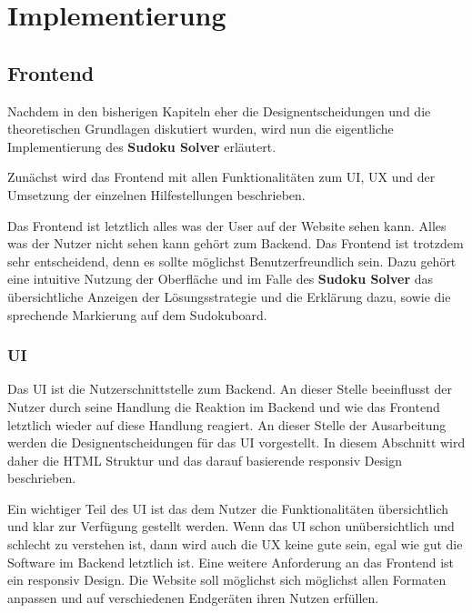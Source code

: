 
\part{Implementierung}

\chapter{Frontend}
Nachdem in den bisherigen Kapiteln eher die Designentscheidungen und die theoretischen Grundlagen diskutiert wurden, wird nun die eigentliche Implementierung des \textbf{Sudoku Solver} erläutert.

Zunächst wird das Frontend mit allen Funktionalitäten zum \acs{UI}, \acs{UX} und der Umsetzung der einzelnen Hilfestellungen beschrieben. 

Das Frontend ist letztlich alles was der User auf der Website sehen kann. Alles was der Nutzer nicht sehen kann gehört zum Backend. Das Frontend ist trotzdem sehr entscheidend, denn es sollte möglichst Benutzerfreundlich sein. Dazu gehört eine intuitive Nutzung der Oberfläche und im Falle des \textbf{Sudoku Solver} das übersichtliche Anzeigen der Lösungsstrategie und die Erklärung dazu, sowie die sprechende Markierung auf dem Sudokuboard.

\section{\acl{UI}}
Das \acs{UI} ist die Nutzerschnittstelle zum Backend. An dieser Stelle beeinflusst der Nutzer durch seine Handlung die Reaktion im Backend und wie das Frontend letztlich wieder auf diese Handlung reagiert. An dieser Stelle der Ausarbeitung werden die Designentscheidungen für das \ac{UI} vorgestellt. In diesem Abschnitt wird daher die \ac{HTML} Struktur und das darauf basierende responsiv Design beschrieben.

Ein wichtiger Teil des \ac{UI} ist das dem Nutzer die Funktionalitäten übersichtlich und klar zur Verfügung gestellt werden. Wenn das \ac{UI} schon unübersichtlich und schlecht zu verstehen ist, dann wird auch die \acs{UX} keine gute sein, egal wie gut die Software im Backend letztlich ist. Eine weitere Anforderung an das Frontend ist ein responsiv Design. Die Website soll möglichst sich möglichst allen Formaten anpassen und auf verschiedenen Endgeräten ihren Nutzen erfüllen.

